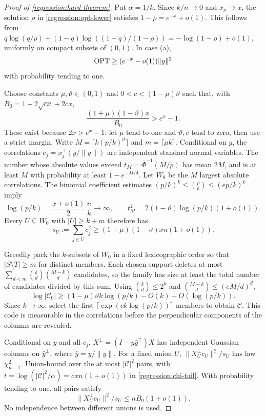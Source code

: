 \begin{proof}[Proof of \cref{regression:hard-theorem}]
Put $\alpha=1/k$. Since $k/n\to0$ and $x_p\to x$,
the solution $\rho$ in \cref{regression:opt-lower} satisfies
$1-\rho=e^{-x}+o(1)$. This follows from
$q\log(q/\rho)+(1-q)\log((1-q)/(1-\rho))
=-\log(1-\rho)+o(1)$, uniformly on compact subsets of $(0,1)$.
In case (a),
\begin{equation}\label{regression:hard-opt}
 \operatorname{OPT}\geq(e^{-x}-o(1))\|y\|^2
\end{equation}
with probability tending to one.

Choose constants $\mu,\vartheta\in(0,1)$ and
$0<c<(1-\mu)\vartheta$ such that, with
$B_0=1+2\sqrt{cx}+2cx$,
\begin{equation}\label{regression:hard-parameters}
 \frac{(1+\mu)(1-\vartheta)x}{B_0}>e^x-1 .
\end{equation}
These exist because $2x>e^x-1$: let $\mu$ tend to one and
$\vartheta,c$ tend to zero, then use a strict margin.
Write $M=\lceil k(p/k)^\vartheta\rceil$ and
$m=\lceil\mu k\rceil$. Conditional on $y$, the correlations
$c_j=x_j^\top(y/\|y\|)$ are independent standard normal variables.
The number whose absolute values exceed
$t_M=\overline\Phi^{-1}(M/p)$ has mean $2M$, and is at least
$M$ with probability at least $1-e^{-M/4}$.
Let $W_0$ be the $M$ largest absolute correlations.
The binomial coefficient estimates
$(p/k)^k\leq\binom pk\leq(ep/k)^k$ imply
\[
 \log(p/k)=\frac{x+o(1)}2\,\frac nk\longrightarrow\infty,
 \qquad
 t_M^2=2(1-\vartheta)\log(p/k)(1+o(1)).
\]
Every $U\subseteq W_0$ with $|U|\geq k+m$ therefore has
\begin{equation}\label{regression:hard-correlation}
 s_U:=\sum_{j\in U}c_j^2
       \geq(1+\mu)(1-\vartheta)xn(1+o(1)).
\end{equation}

Greedily pack the $k$-subsets of $W_0$ in a fixed lexicographic
order so that $|S\setminus T|\geq m$ for distinct members.
Each chosen support deletes at most
$\sum_{d<m}\binom kd\binom{M-k}d$ candidates, so the family has
size at least the total number of candidates divided by this sum.
Using $\binom kd\leq2^k$ and
$\binom{M-k}d\leq(eM/d)^d$,
\[
 \log|\mathcal C_0|
 \geq(1-\mu)\vartheta k\log(p/k)-O(k)-O(\log(p/k)).
\]
Since $k\to\infty$, select the first
$\lceil\exp(c k\log(p/k))\rceil$ members to obtain $\mathcal C$.
This code is measurable in the correlations before the
perpendicular components of the columns are revealed.

Conditional on $y$ and all $c_j$,
$X^\perp=(I-\widehat y\widehat y^\top)X$ has independent
Gaussian columns on $\widehat y^\perp$, where
$\widehat y=y/\|y\|$. For a fixed union $U$,
$\|X_U^\perp c_U\|^2/s_U$ has law $\chi_{n-1}^2$.
Union-bound over the at most $|\mathcal C|^2$ pairs, with
$t=\log(|\mathcal C|^2/\alpha)=cxn(1+o(1))$ in
\eqref{regression:chi-tail}. With probability tending to one,
all pairs satisfy
\begin{equation}\label{regression:hard-perp}
 \|X_U^\perp c_U\|^2/s_U\leq nB_0(1+o(1)).
\end{equation}
No independence between different unions is used.


\end{proof}
